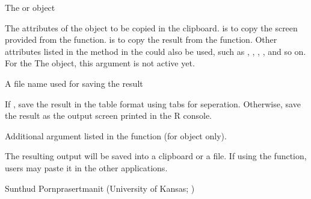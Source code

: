 \documentclass[a4paper]{book}
\begin{document}
\begin{Arguments}
\begin{ldescription}
\item[\code{object}] 
The  or  object

\item[\code{what}] 
The attributes of the  object to be copied in the clipboard.  is to copy the screen provided from the  function.  is to copy the result from the  function. Other attributes listed in the  method in the  could also be used, such as , , , , and so on. For the The  object, this argument is not active yet.

\item[\code{file}] 
A file name used for saving the result

\item[\code{tableFormat}] 
If , save the result in the table format using tabs for seperation. Otherwise, save the result as the output screen printed in the R console.

\item[\code{...}] 
Additional argument listed in the  function (for  object only).

\end{ldescription}
\end{Arguments}
%
\begin{Value}
The resulting output will be saved into a clipboard or a file. If using the  function, users may paste it in the other applications.
\end{Value}
%
\begin{Author}\relax
Sunthud Pornprasertmanit (University of Kansas; )
\end{Author}
%
\end{document}
